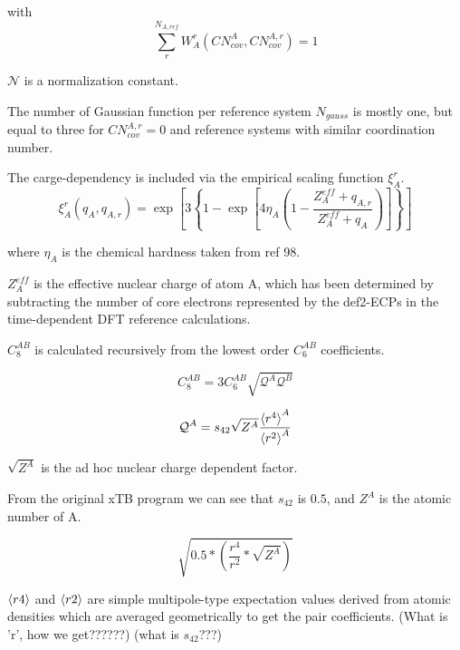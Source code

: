 \documentclass{article}
\begin{document}
with
\begin{equation}
  \sum_{r}^{N_{A,ref}} W_A^r(CN_{cov}^A, CN_{cov}^{A,r}) = 1
\end{equation}

\vspace{10pt}
\noindent
\(\mathcal{N}\) is a normalization constant.

\noindent
The number of Gaussian function per reference system \(N_{gauss}\) is mostly one, but equal to three for \(CN_{cov}^{A,r} = 0\) and reference systems with similar coordination number.

\noindent
The carge-dependency is included via the empirical scaling function \(\xi_A^r\).
\begin{equation}
  \xi_A^r(q_A, q_{A,r}) = \exp\left[3\left\{1-\exp\left[4\eta_A\left(1-\frac{Z_A^{eff} + q_{A,r}}{Z_A^{eff} + q_A}\right)\right]\right\}\right]
\end{equation}

\noindent
where \(\eta_A\) is the chemical hardness taken from ref 98.

\noindent
\(Z_A^{eff}\) is the effective nuclear charge of atom A, which has been determined by subtracting the number of core electrons represented by the def2-ECPs in the time-dependent DFT reference calculations.



\vspace{10pt}
\noindent
\(C_8^{AB}\) is calculated recursively from the lowest order \(C_6^{AB}\) coefficients.

\begin{equation}
  C_8^{AB} = 3C_6^{AB} \sqrt{\mathcal{Q}^A\mathcal{Q}^B}
\end{equation}

\begin{equation}
  \mathcal{Q}^A = s_{42} \sqrt{Z^A} \frac{\braket{r^4}^A}{\braket{r^2}^A}
\end{equation}


\vspace{10pt}
\noindent
\(\sqrt{Z^A}\) is the ad hoc nuclear charge dependent factor.

From the original xTB program we can see that \(s_{42}\) is \(0.5\), and \(Z^A\) is the atomic number of A.

\begin{equation}
  \sqrt{0.5 * (\frac{r^4}{r^2} * \sqrt{Z^A})}
\end{equation}


\(\braket{r4}\) and \(\braket{r2}\) are simple multipole-type expectation values derived from atomic densities which are averaged geometrically to get the pair coefficients. (What is 'r', how we get??????) (what is \(s_{42}\)???)
\end{document}
